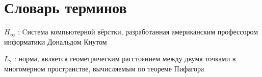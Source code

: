 \chapter*{Словарь терминов}             %

\textbf{\(H_\infty\)} : Cистема компьютерной вёрстки, разработанная американским профессором информатики Дональдом Кнутом

\textbf{\(L_2\)} : норма, является геометрическим расстоянием между двумя точками в многомерном пространстве, вычисляемым по теореме Пифагора
